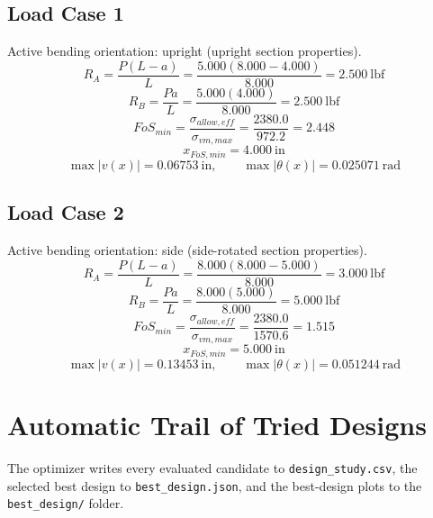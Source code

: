 \documentclass[11pt]{article}
\begin{document}
\subsection*{Load Case 1}
Active bending orientation: upright (upright section properties).
\[R_A = \frac{P(L-a)}{L} = \frac{5.000(8.000-4.000)}{8.000} = 2.500\ \mathrm{lbf}\]
\[R_B = \frac{Pa}{L} = \frac{5.000(4.000)}{8.000} = 2.500\ \mathrm{lbf}\]
\[FoS_{min} = \frac{\sigma_{allow,eff}}{\sigma_{vm,max}} = \frac{2380.0}{972.2} = 2.448\]
\[x_{FoS,min} = 4.000\ \mathrm{in}\]
\[\max |v(x)| = 0.06753\ \mathrm{in}, \qquad \max |\theta(x)| = 0.025071\ \mathrm{rad}\]
\subsection*{Load Case 2}
Active bending orientation: side (side-rotated section properties).
\[R_A = \frac{P(L-a)}{L} = \frac{8.000(8.000-5.000)}{8.000} = 3.000\ \mathrm{lbf}\]
\[R_B = \frac{Pa}{L} = \frac{8.000(5.000)}{8.000} = 5.000\ \mathrm{lbf}\]
\[FoS_{min} = \frac{\sigma_{allow,eff}}{\sigma_{vm,max}} = \frac{2380.0}{1570.6} = 1.515\]
\[x_{FoS,min} = 5.000\ \mathrm{in}\]
\[\max |v(x)| = 0.13453\ \mathrm{in}, \qquad \max |\theta(x)| = 0.051244\ \mathrm{rad}\]

\section*{Automatic Trail of Tried Designs}
The optimizer writes every evaluated candidate to \texttt{design\_study.csv}, the selected best design to \texttt{best\_design.json}, and the best-design plots to the \texttt{best\_design/} folder.
\end{document}
